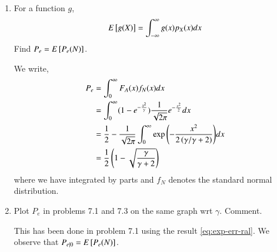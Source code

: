 \documentclass[journal,12pt,twocolumn]{IEEEtran}
\renewcommand\thesection{\arabic{section}}
\begin{document}
\begin{enumerate}[label=\thesection.\arabic*
,ref=\thesection.\theenumi]
\item For a function $g$,
	\begin{align}
		E{}\left[g(X)\right] = \int_{-\infty}^{\infty}g(x)p_X(x)dx
	\end{align}
Find $P_e = E{}\left[P_e(N)\right]$.

\solution
We write,
		\begin{align}
			P_e &= \int_{0}^{\infty}F_A(x)f_N(x)dx \\
			&= \int_{0}^{\infty}(1 - e^{-\frac{x^2}{\gamma}})\frac{1}{\sqrt{2\pi}}e^{-\frac{x^2}{2}}dx \\
			&= \frac{1}{2} - \frac{1}{\sqrt{2\pi}}\int_{0}^{\infty}\exp{\ensuremath{\left(-\frac{x^2}{2\left(\gamma/\gamma + 2\right)}\right)}}dx \\
			&= \frac{1}{2}\left(1 - \sqrt{\frac{\gamma}{\gamma + 2}}\right)
			\label{eq:exp-err-ral}
		\end{align}
where we have integrated by parts and $f_N$ denotes the standard normal distribution. 

\item Plot $P_e$ in problems 7.1 and 7.3 on the same graph wrt $\gamma$. Comment.

\solution
This has been done in problem 7.1 using the result \eqref{eq:exp-err-ral}. We observe that $P_{e|0} = E{}\left[P_e(N)\right]$.
\end{enumerate}
\end{document}
